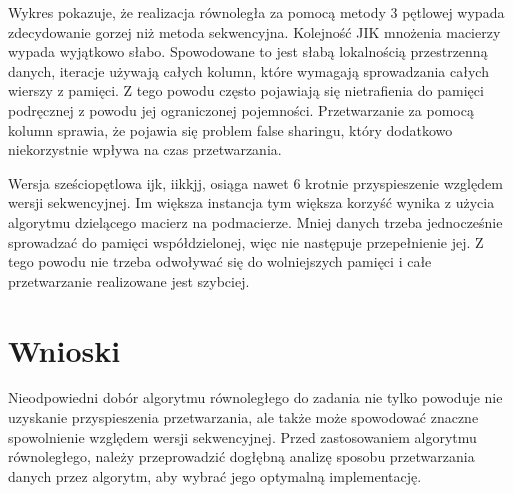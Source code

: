 \documentclass{article}
\begin{document}
Wykres pokazuje, że realizacja równoległa za pomocą metody 3 pętlowej wypada zdecydowanie gorzej niż metoda sekwencyjna. Kolejność JIK mnożenia macierzy wypada wyjątkowo słabo. Spowodowane to jest słabą lokalnością przestrzenną danych, iteracje używają całych kolumn, które wymagają sprowadzania całych wierszy z pamięci. Z tego powodu często pojawiają się nietrafienia do pamięci podręcznej z powodu jej ograniczonej pojemności. Przetwarzanie za pomocą kolumn sprawia, że pojawia się problem false sharingu, który dodatkowo niekorzystnie wpływa na czas przetwarzania.

Wersja sześciopętlowa ijk, iikkjj, osiąga nawet 6 krotnie przyspieszenie względem wersji sekwencyjnej. Im większa instancja tym większa korzyść wynika z użycia algorytmu dzielącego macierz na podmacierze. Mniej danych trzeba jednocześnie sprowadzać do pamięci współdzielonej, więc nie następuje przepełnienie jej. Z tego powodu nie trzeba odwoływać się do wolniejszych pamięci i całe przetwarzanie realizowane jest szybciej. 

\section{Wnioski}
Nieodpowiedni dobór algorytmu równoległego do zadania nie tylko powoduje nie uzyskanie przyspieszenia przetwarzania, ale także może spowodować znaczne spowolnienie względem wersji sekwencyjnej. Przed zastosowaniem algorytmu równoległego, należy przeprowadzić dogłębną analizę sposobu przetwarzania danych przez algorytm, aby wybrać jego optymalną implementację.
\end{document}
